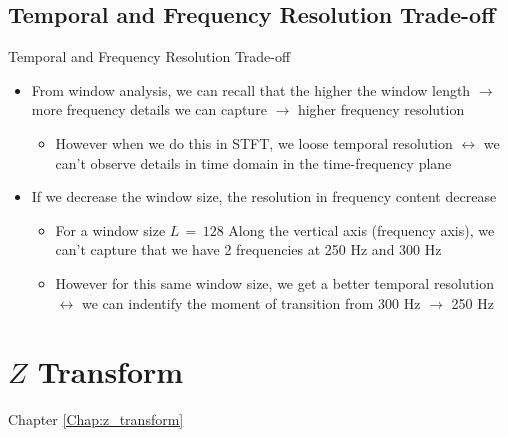 \documentclass{beamer}
\begin{document}
\subsection{Temporal and Frequency Resolution Trade-off}
\begin{frame}[t,allowframebreaks]{Temporal and Frequency Resolution Trade-off}

\begin{itemize}

\item From window analysis, we can recall that the higher the window length $\rightarrow$ more frequency details we can capture $\rightarrow$ higher frequency resolution

	\begin{itemize}
	\item However when we do this in STFT, we loose temporal resolution $\leftrightarrow$ we can't observe details in time domain in the time-frequency plane
	\end{itemize}

\item If we decrease the window size, the resolution in frequency content decrease

	\begin{itemize}
	\item For a window size $L \, = \, 128$ Along the vertical axis (frequency axis), we can't capture that we have 2 frequencies at 250 Hz and 300 Hz
	
	\item However for this same window size, we get a better temporal resolution $\leftrightarrow$ we can indentify the moment of transition from 300 Hz $\rightarrow$ 250 Hz
	\end{itemize}


\end{itemize}


\end{frame}


\section{$Z$ Transform}
\label{Chap:z_transform}
\begin{frame}[t,allowframebreaks]{Chapter \autoref{Chap:z_transform}}
\tableofcontents[sections= \value{section}]
\end{frame}
\end{document}
